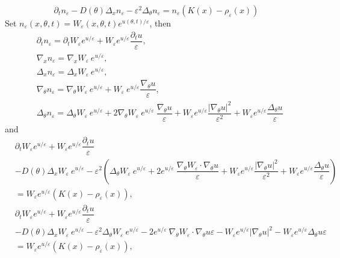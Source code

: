 \documentclass[preprint]{elsarticle}
\numberwithin{equation}{section}
\begin{document}
$$
    \partial_t n_\varepsilon -D(\theta)\Delta_x n_\varepsilon -\varepsilon^2\Delta_\theta n_\varepsilon = n_\varepsilon(K(x)-\rho_\varepsilon(x))
$$
Set $n_\varepsilon(x,\theta, t) = W_\varepsilon(x,\theta, t) e^{u(\theta, t)/\varepsilon}$, then
\begin{equation}
\begin{aligned}
&\partial_t n_\varepsilon = \partial_t W_\varepsilon e^{u/\varepsilon} + W_\varepsilon e^{u/\varepsilon}\dfrac{\partial_t u}{\varepsilon},\\
&\nabla_x n_\varepsilon = \nabla_x W_\varepsilon ~e^{u/\varepsilon},\\
&\Delta_x n_\varepsilon = \Delta_x W_\varepsilon ~e^{u/\varepsilon},\\
&\nabla_\theta n_\varepsilon = \nabla_\theta W_\varepsilon ~e^{u/\varepsilon} + W_\varepsilon ~e^{u/\varepsilon} \dfrac{\nabla_\theta u}{\varepsilon},\\
&\Delta_\theta n_\varepsilon = \Delta_\theta W_\varepsilon ~e^{u/\varepsilon} + 2\nabla_\theta W_\varepsilon~e^{u/\varepsilon}~\dfrac{\nabla_\theta u}{\varepsilon} + W_\varepsilon e^{u/\varepsilon}\dfrac{|\nabla_\theta u|^2}{\varepsilon^2} + W_\varepsilon e^{u/\varepsilon}\dfrac{\Delta_\theta u}{\varepsilon}
\end{aligned}
\end{equation}
and
\begin{equation}
\begin{aligned}
&\partial_t W_\varepsilon e^{u/\varepsilon} + W_\varepsilon e^{u/\varepsilon}\dfrac{\partial_t u}{\varepsilon}\\
&-D(\theta)\Delta_x W_\varepsilon ~e^{u/\varepsilon} -\varepsilon^2\left(\Delta_\theta W_\varepsilon ~e^{u/\varepsilon} + 2e^{u/\varepsilon}~\dfrac{\nabla_\theta W_\varepsilon\cdot \nabla_\theta u}{\varepsilon} + W_\varepsilon e^{u/\varepsilon}\dfrac{|\nabla_\theta u|^2}{\varepsilon^2} + W_\varepsilon e^{u/\varepsilon}\dfrac{\Delta_\theta u}{\varepsilon}\right)\\
&= W_\varepsilon e^{u/\varepsilon}(K(x)-\rho_\varepsilon(x)),\\
&\partial_t W_\varepsilon e^{u/\varepsilon} + W_\varepsilon e^{u/\varepsilon}\dfrac{\partial_t u}{\varepsilon}\\
&-D(\theta)\Delta_x W_\varepsilon ~e^{u/\varepsilon} -\varepsilon^2\Delta_\theta W_\varepsilon ~e^{u/\varepsilon} - 2e^{u/\varepsilon}~\nabla_\theta W_\varepsilon\cdot \nabla_\theta u\varepsilon - W_\varepsilon e^{u/\varepsilon}|\nabla_\theta u|^2 - W_\varepsilon e^{u/\varepsilon}\Delta_\theta u\varepsilon\\
&= W_\varepsilon e^{u/\varepsilon}(K(x)-\rho_\varepsilon(x)),\\
\end{aligned}
\end{equation}
\end{document}
